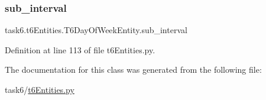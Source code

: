 \subsubsection{\texorpdfstring{sub\+\_\+interval}{sub\_interval}}
{\footnotesize\ttfamily task6.\+t6\+Entities.\+T6\+Day\+Of\+Week\+Entity.\+sub\+\_\+interval}



Definition at line 113 of file t6\+Entities.\+py.



The documentation for this class was generated from the following file\+:\begin{DoxyCompactItemize}
\item 
task6/\hyperlink{t6Entities_8py}{t6\+Entities.\+py}\end{DoxyCompactItemize}
